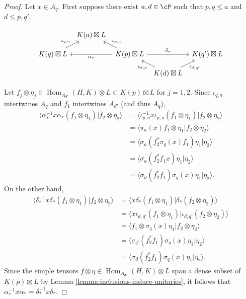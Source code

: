 \documentclass[11pt,reqno]{amsart}
\DeclareMathOperator{\Hom}{Hom}
\numberwithin{equation}{section}
\theoremstyle{plain}
\theoremstyle{definition}
\begin{document}
\begin{proof}
    Let $x\in A_q$. First suppose there exist $a,d\in{\cP}$ such that $p,q\leq a$ and $d\leq p,q'$. 
    
\[\begin{tikzcd}[column sep=.5em, row sep=.5em]
	& {K(a)\boxtimes L} &&& \\
	\\
	{K(q)\boxtimes L} && {K(p)\boxtimes L} && {K(q')\boxtimes L} \\
	\\
	&&& {K(d)\boxtimes L}
	\arrow["{{\iota_{q,a}}}", from=3-1, to=1-2]
	\arrow["{{\iota_{p,a}}}"', from=3-3, to=1-2]
	\arrow["{{\alpha_*}}", from=3-3, to=3-1]
	\arrow["{{\delta_*}}", from=3-3, to=3-5]
	\arrow["{{\iota_{d,p}}}", from=5-4, to=3-3]
	\arrow["{{\iota_{d,q'}}}"', from=5-4, to=3-5]
\end{tikzcd}\]

    Let $f_j\otimes\eta_j\in \Hom_{A_{d'}}(H,K)\otimes L\subset K(p)\boxtimes L$ for $j=1,2$. Since $\iota_{q,a}$ intertwines $A_q$ and $f_1$ intertwines $A_{d'}$ (and thus $A_q$),
    \begin{align*}
        \langle \alpha_*^{-1}x\alpha_*(f_1\otimes\eta_1)|f_2\otimes\eta_2\rangle
        &=\langle \iota_{p,a}^{-1}x\iota_{p,a}(f_1\otimes\eta_1)|f_2\otimes\eta_2\rangle \\
        &=\langle \pi_a(x)f_1\otimes\eta_1|f_2\otimes\eta_2\rangle \\
        &=\langle \sigma_a(f_2^*\pi_q(x)f_1)\eta_1|\eta_2\rangle \\
        &=\langle \sigma_a(f_2^*f_1x)\eta_1|\eta_2\rangle \\
        &=\langle \sigma_d(f_2^*f_1)\sigma_q(x)\eta_1|\eta_2\rangle.
    \end{align*}
    On the other hand,
    \begin{align*}
        \langle \delta_*^{-1}x\delta_*(f_1\otimes\eta_1)|f_2\otimes\eta_2\rangle
        &=\langle x\delta_*(f_1\otimes\eta_1)|\delta_*(f_2\otimes\eta_2)\rangle \\
        &=\langle x\iota_{d,q'}(f_1\otimes\eta_1)|\iota_{d,q'}(f_2\otimes\eta_2)\rangle\\
        &=\langle f_1\otimes\sigma_q(x)\eta_1|f_2\otimes\eta_2\rangle \\
        &=\langle \sigma_{q'}(f_2^*f_1)\sigma_q(x)\eta_1|\eta_2\rangle \\
        &=\langle \sigma_{d}(f_2^*f_1)\sigma_q(x)\eta_1|\eta_2\rangle.
    \end{align*}
    Since the simple tensors $f\otimes\eta\in \Hom_{A_{d'}}(H,K)\otimes L$ span a dense subset of $K(p)\boxtimes L$ by Lemma \ref{lemma:inclusions-induce-unitaries}, it follows that $\alpha_*^{-1}x\alpha_*=\delta_*^{-1}x\delta_*$.


\end{proof}
\end{document}
